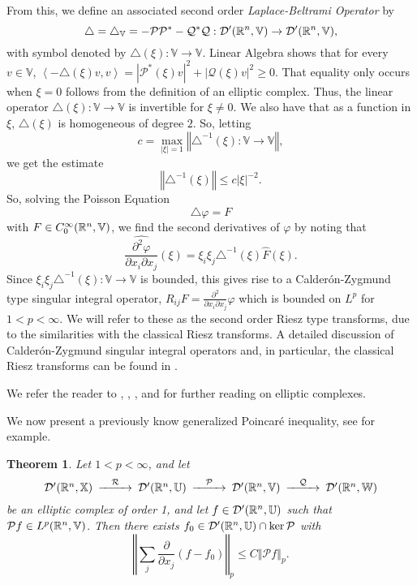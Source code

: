 \documentclass{amsart}
\newtheorem{theorem}{Theorem}[section]
\theoremstyle{definition}
\numberwithin{equation}{section}
\begin{document}
From this, we define an associated second order \textit{Laplace-Beltrami Operator} by $$\triangle = \triangle_{\mathbb{V}} = -{\mathcal{P}} {\mathcal{P}}^* - {\mathcal{Q}}^*{\mathcal{Q}}: {\mathcal{D}}'(\Bbb R^n, {\mathbb{V}}) \to {\mathcal{D}}'(\Bbb R^n, {\mathbb{V}}),$$ with symbol denoted by $\triangle(\xi):{\mathbb{V}} \to {\mathbb{V}}$.  Linear Algebra shows that for every $v\in {\mathbb{V}}$, $\left< -\triangle(\xi) v, v \right> = {\left\vert{{\mathcal{P}}^*(\xi)v}\right\vert}^2 + {\left\vert{{\mathcal{Q}}(\xi)v}\right\vert}^2 \geq 0$.  That equality only occurs when $\xi=0$ follows from the definition of an elliptic complex.  Thus, the linear operator $\triangle(\xi): {\mathbb{V}} \to {\mathbb{V}}$ is invertible for $\xi\neq0$.  We also have that as a function in $\xi$, $\triangle(\xi)$ is homogeneous of degree $2$.  So, letting $$c= \max_{{\left\vert{\xi}\right\vert}=1} {\left\Vert{\triangle^{-1}(\xi): {\mathbb{V}} \to {\mathbb{V}}}\right\Vert}, $$ we get the estimate $${\left\Vert{\triangle^{-1}(\xi)}\right\Vert} \leq c {\left\vert{\xi}\right\vert}^{-2}.$$  So, solving the Poisson Equation $$\triangle {\varphi} =F$$ with $F \in C_0^\infty(\Bbb R^n, {\mathbb{V}})$, we find the second derivatives of ${\varphi}$ by noting that $$\widehat{\frac {\partial^2 {\varphi}} {\partial x_i \partial x_j}} (\xi) = \xi_i\xi_j \triangle^{-1}(\xi) \widehat{F}(\xi).$$  Since $\xi_i\xi_j \triangle^{-1}(\xi): {\mathbb{V}} \to {\mathbb{V}}$ is bounded, this gives rise to a Calder\'{o}n-Zygmund type singular integral operator, $R_{ij}F = \frac {\partial^2} {\partial x_i \partial x_j}{\varphi}$ which is bounded on $L^p$ for $1<p<\infty$.  We will refer to these as the second order Riesz type transforms, due to the similarities with the classical Riesz transforms.  A detailed discussion of Calder\'{o}n-Zygmund singular integral operators and, in particular, the classical Riesz transforms can be found in \cite{Stein70}.

We refer the reader to \cite{Donofrio_Iwaniec03}, \cite{Giannetti_Verde00}, \cite{Tarkhanov95}, and \cite{Uhlenbeck77} for further reading on elliptic complexes.   

We now present a previously know generalized Poincar\'e inequality, see \cite{Giannetti_Verde00} for example.

\begin{theorem}\label{Elliptic_complex}
Let $1<p<\infty$, and let $$\begin{CD} {\mathcal{D}}'(\Bbb R^n, {\mathbb{X}}) @>{\mathcal{R}}>> {\mathcal{D}}'(\Bbb R^n, {\mathbb{U}}) @>{\mathcal{P}}>> {\mathcal{D}}'(\Bbb R^n, {\mathbb{V}}) @>{\mathcal{Q}}>> {\mathcal{D}}'(\Bbb R^n, {\mathbb{W}})\end{CD}$$ be an elliptic complex of order 1, and let $f \in {\mathcal{D}}'(\Bbb R^n, {\mathbb{U}})$ such that ${\mathcal{P}} f\in L^p(\Bbb R^n, {\mathbb{V}})$.  Then there exists $f_0 \in {\mathcal{D}}'(\Bbb R^n, {\mathbb{U}}) \cap \ker {\mathcal{P}}$ with $${\left\Vert{\sum_j \frac {\partial}{\partial x_j}\left(f-f_0\right)}\right\Vert}_{p} \leq C {\left\Vert{{\mathcal{P}} f}\right\Vert}_p.$$
\end{theorem}
\end{document}
